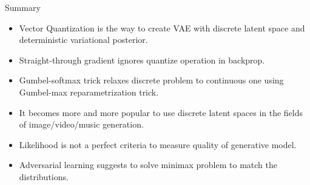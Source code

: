 \begin{frame}{Summary}
	\begin{itemize}
		\item Vector Quantization is the way to create VAE with discrete latent space and deterministic variational posterior. 
		\vfill
		\item Straight-through gradient ignores quantize operation in backprop.			
		\vfill
		\item Gumbel-softmax trick relaxes discrete problem to continuous one using Gumbel-max reparametrization trick.
		\vfill
		\item It becomes more and more popular to use discrete latent spaces in the fields of image/video/music generation.
		\vfill
		\item Likelihood is not a perfect criteria to measure quality of generative model.		
		\vfill
		\item Adversarial learning suggests to solve minimax problem to match the distributions.
	\end{itemize}
\end{frame}

 
